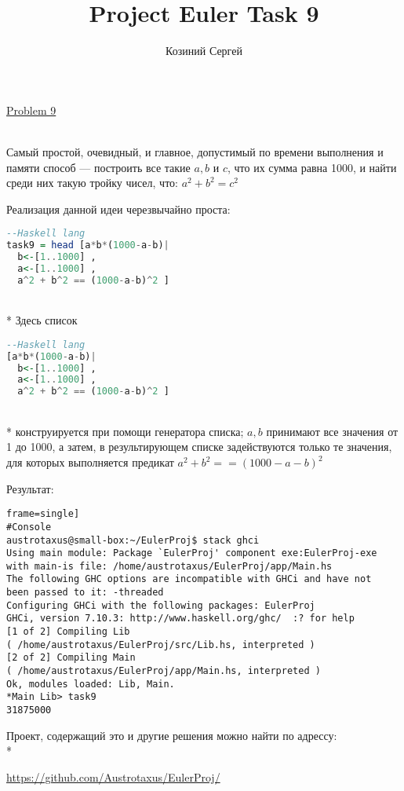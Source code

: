 \documentclass[11pt,a4paper]{article}
\title{Project Euler Task 9}
\author{Козиний Сергей}
\begin{document}
    
\maketitle
\href{''https://projecteuler.net/problem=9''}{Problem 9}

\\

Самый простой, очевидный, и главное, допустимый по времени выполнения и памяти способ ---  построить все такие $a,b$ и $c$, что их сумма равна 1000, и найти среди них такую тройку чисел, что:  $a^2 + b^2 = c^2$

Реализация данной идеи черезвычайно проста:

\begin{lstlisting}[language=Haskell, frame=single]
--Haskell lang
task9 = head [a*b*(1000-a-b)|
  b<-[1..1000] ,
  a<-[1..1000] ,
  a^2 + b^2 == (1000-a-b)^2 ]

\end{lstlisting} \\*
Здесь список
\begin{lstlisting}[language=Haskell, frame=single]
--Haskell lang
[a*b*(1000-a-b)|
  b<-[1..1000] ,
  a<-[1..1000] ,
  a^2 + b^2 == (1000-a-b)^2 ]
\end{lstlisting} \\*
конструируется при помощи генератора списка; $a, b$ принимают все значения от 1 до 1000, а затем, в результирующем списке задействуются только те значения, для которых выполняется предикат $a^2 + b^2 == (1000-a-b)^2$

Результат:
\begin{lstlisting}frame=single]
#Console
austrotaxus@small-box:~/EulerProj$ stack ghci
Using main module: Package `EulerProj' component exe:EulerProj-exe
with main-is file: /home/austrotaxus/EulerProj/app/Main.hs
The following GHC options are incompatible with GHCi and have not
been passed to it: -threaded
Configuring GHCi with the following packages: EulerProj
GHCi, version 7.10.3: http://www.haskell.org/ghc/  :? for help
[1 of 2] Compiling Lib
( /home/austrotaxus/EulerProj/src/Lib.hs, interpreted )
[2 of 2] Compiling Main
( /home/austrotaxus/EulerProj/app/Main.hs, interpreted )
Ok, modules loaded: Lib, Main. 
*Main Lib> task9
31875000
\end{lstlisting}

Проект, содержащий это и другие решения можно найти по адрессу:\\*

\url{https://github.com/Austrotaxus/EulerProj/}
\end{document}
